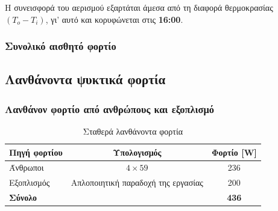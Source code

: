 \documentclass[12pt,a4paper]{article}
\begin{document}
Η συνεισφορά του αερισμού εξαρτάται άμεσα από τη διαφορά θερμοκρασίας
\((T_o - T_i)\), γι' αυτό και κορυφώνεται στις \textbf{16:00}.

\subsubsection{Συνολικό αισθητό φορτίο}

\begin{table}[H]
\centering
\caption{Συγκεντρωτικός πίνακας αισθητών φορτίων}
\end{table}

\subsection{Λανθάνοντα ψυκτικά φορτία}

\subsubsection{Λανθάνον φορτίο από ανθρώπους και εξοπλισμό}

\begin{table}[H]
\centering
\caption{Σταθερά λανθάνοντα φορτία}
\begin{tabular}{lcc}
\toprule
\textbf{Πηγή φορτίου} & \textbf{Υπολογισμός} & \textbf{Φορτίο [W]} \\
\midrule
Άνθρωποι & \(4 \times 59\) & 236 \\
Εξοπλισμός & Απλοποιητική παραδοχή της εργασίας & 200 \\
\midrule
\textbf{Σύνολο} &  & \textbf{436} \\
\bottomrule
\end{tabular}
\end{table}
\end{document}
